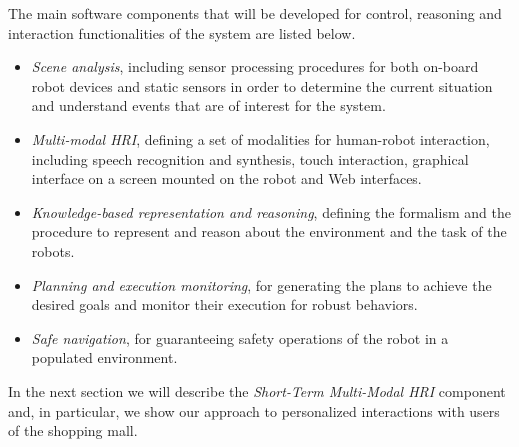The main software components that will be developed for control, reasoning and interaction functionalities of the system are listed below.

\vspace{-1em}
\begin{itemize}
\item \emph{Scene analysis}, including sensor processing procedures for both on-board robot devices and static sensors in order to determine the current situation and understand events that are of interest for the system.

\item \emph{Multi-modal HRI}, defining a set of modalities for human-robot interaction, including speech recognition and synthesis, touch interaction, graphical interface on a screen mounted on the robot and Web interfaces.

\item \emph{Knowledge-based representation and reasoning}, defining the formalism and the procedure to represent and reason about the environment and the task of the robots.

\item \emph{Planning and execution monitoring}, for generating the plans to achieve the desired goals and monitor their execution for robust behaviors.

\item \emph{Safe navigation}, for guaranteeing safety operations of the robot in a populated environment.

\end{itemize}

In the next section we will describe the \emph{Short-Term Multi-Modal HRI} component
and, in particular, we show our approach to personalized interactions with users of the shopping mall.

